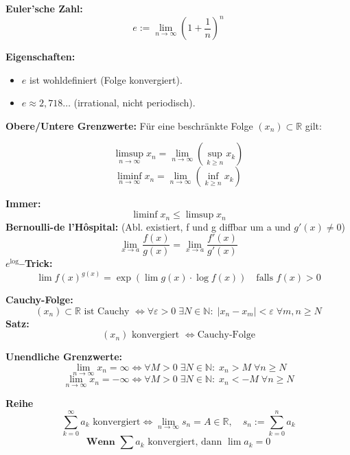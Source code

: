 \textbf{Euler'sche Zahl:}  
\[
e := \lim\limits_{n \to \infty} \left( 1 + \frac{1}{n} \right)^n
\]

\textbf{Eigenschaften:}
\begin{itemize}
  \item \( e \) ist wohldefiniert (Folge konvergiert).
  \item \( e \approx 2{,}718\ldots \) (irrational, nicht periodisch).
\end{itemize}

\textbf{Obere/Untere Grenzwerte:}  
Für eine beschränkte Folge \( (x_n) \subset \mathbb{R} \) gilt:

\[
\limsup\limits_{n \to \infty} x_n = \lim\limits_{n \to \infty} \left( \sup_{k \geq n} x_k \right)
\]
\[
\liminf\limits_{n \to \infty} x_n = \lim\limits_{n \to \infty} \left( \inf_{k \geq n} x_k \right)
\]

\textbf{Immer:}  
\[
\liminf x_n \leq \limsup x_n
\]
\textbf{Bernoulli-de l'Hôspital:} (Abl. existiert, f und g diffbar um a und $g'(x) \not = 0$)
\[
\lim\limits_{x \to a} \frac{f(x)}{g(x)} = \lim\limits_{x \to a} \frac{f'(x)}{g'(x)}
\]
\textbf{\( e^{\log} \)–Trick:}  
\[
\lim f(x)^{g(x)} = \exp\left( \lim g(x) \cdot \log f(x) \right)
\quad \text{falls } f(x) > 0
\]

\textbf{Cauchy-Folge:}  
\[
(x_n) \subset \mathbb{R} \text{ ist Cauchy } \Leftrightarrow  
\forall \varepsilon > 0\; \exists N \in \mathbb{N}:\; |x_n - x_m| < \varepsilon \; \forall m,n \geq N
\]
\textbf{Satz:}  
\[
(x_n) \text{ konvergiert } \Leftrightarrow \text{Cauchy-Folge}
\]

\textbf{Unendliche Grenzwerte:}  
\[
\lim_{n \to \infty} x_n = \infty \Leftrightarrow  
\forall M > 0\; \exists N \in \mathbb{N}:\; x_n > M\; \forall n \geq N
\]
\[
\lim_{n \to \infty} x_n = -\infty \Leftrightarrow  
\forall M > 0\; \exists N \in \mathbb{N}:\; x_n < -M\; \forall n \geq N
\]

\textbf{Reihe }
\[
\sum_{k=0}^\infty a_k \text{ konvergiert} \Leftrightarrow 
\lim_{n \to \infty} s_n = A \in \mathbb{R},\quad s_n := \sum_{k=0}^n a_k
\]
\[
\textbf{Wenn } \sum a_k \text{ konvergiert, dann } \lim a_k = 0
\]

